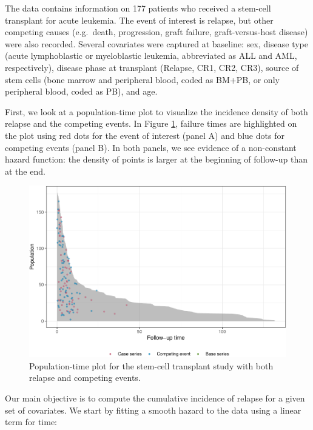 The data contains information on 177 patients who received a stem-cell
transplant for acute leukemia. The event of interest is relapse, but
other competing causes (e.g.~death, progression, graft failure,
graft-versus-host disease) were also recorded. Several covariates were
captured at baseline: sex, disease type (acute lymphoblastic or
myeloblastic leukemia, abbreviated as ALL and AML, respectively),
disease phase at transplant (Relapse, CR1, CR2, CR3), source of stem
cells (bone marrow and peripheral blood, coded as BM+PB, or only
peripheral blood, coded as PB), and age.

First, we look at a population-time plot to visualize the incidence
density of both relapse and the competing events. In Figure
\ref{fig:compPop}, failure times are highlighted on the plot using red
dots for the event of interest (panel A) and blue dots for competing
events (panel B). In both panels, we see evidence of a non-constant
hazard function: the density of points is larger at the beginning of
follow-up than at the end.

\begin{Schunk}
\begin{figure}[ht]
\includegraphics[width=\textwidth,keepaspectratio=true]{./compPop-1} \caption[Population-time plot for the stem-cell transplant study with both relapse and competing events]{Population-time plot for the stem-cell transplant study with both relapse and competing events.}\label{fig:compPop}
\end{figure}
\end{Schunk}

Our main objective is to compute the cumulative incidence of relapse for
a given set of covariates. We start by fitting a smooth hazard to the
data using a linear term for time:

